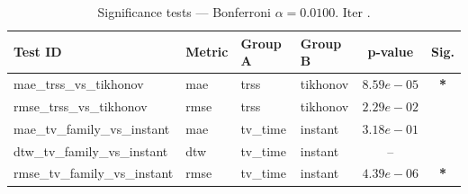 ﻿%
\begin{table}[ht]
\centering
\caption[EEG reconstruction - Iteration it17]{Significance tests — Bonferroni $\alpha=0.0100$. Iter .}
\label{tab:sig_it17_synthetic_broad_all_graphs}
\small
\begin{tabular}{llllcc}
\toprule
Test ID & Metric & Group A & Group B & p-value & Sig. \\
\midrule
mae\_trss\_vs\_tikhonov & mae & trss & tikhonov & $8.59e-05$ & \textbf{*} \\
rmse\_trss\_vs\_tikhonov & rmse & trss & tikhonov & $2.29e-02$ &  \\
mae\_tv\_family\_vs\_instant & mae & tv\_time & instant & $3.18e-01$ &  \\
dtw\_tv\_family\_vs\_instant & dtw & tv\_time & instant & -- &  \\
rmse\_tv\_family\_vs\_instant & rmse & tv\_time & instant & $4.39e-06$ & \textbf{*} \\
\bottomrule
\end{tabular}
\end{table}







